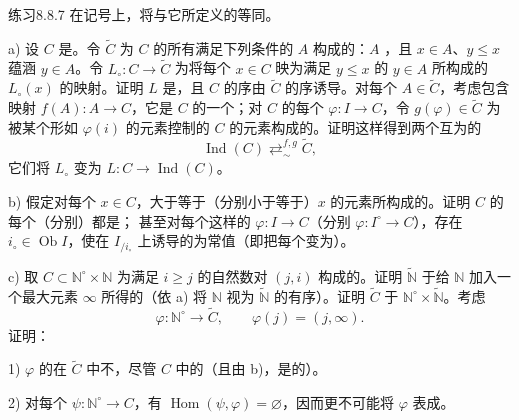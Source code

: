 \begin{SGAresult}{练习}{8.8.7}
在记号上，将与它所定义的等同。

 a) 设 $C$ 是。令 $\widetilde C$ 为 $C$ 的所有满足下列条件的 $A$ 构成的：$A$ ，且 $x\in A$、$y\leq x$ 蕴涵 $y\in A$。令 $L_\circ:C\to\widetilde C$ 为将每个 $x\in C$ 映为满足 $y\leq x$ 的 $y\in A$ 所构成的 $L_\circ(x)$ 的映射。证明 $L$ 是，且 $C$ 的序由 $\widetilde C$ 的序诱导。对每个 $A\in\widetilde C$，考虑包含映射 $f(A):A\to C$，它是 $C$ 的一个；对 $C$ 的每个  $\varphi:I\to C$，令 $g(\varphi)\in\widetilde C$ 为被某个形如 $\varphi(i)$ 的元素控制的 $C$ 的元素构成的。证明这样得到两个互为的
\[
\operatorname{Ind}(C)\mathrel{\mathop{\rightleftarrows}^{f,g}_{\sim}}\widetilde C,
\]
它们将 $L_\circ$ 变为 $L:C\to\operatorname{Ind}(C)$。

 b) 假定对每个 $x\in C$，大于等于（分别小于等于）$x$ 的元素所构成的。证明 $C$ 的每个（分别）都是；
甚至对每个这样的 $\varphi:I\to C$（分别 $\varphi:I^\circ\to C$），存在 $i_\circ\in\operatorname{Ob}I$，使在 $I_{/i_\circ}$ 上诱导的为常值（即把每个变为）。

 c) 取 $C\subset\mathbb N^\circ\times\mathbb N$ 为满足 $i\geq j$ 的自然数对 $(j,i)$ 构成的。证明 $\widetilde{\mathbb N}$ 于给 $\mathbb N$ 加入一个最大元素 $\infty$ 所得的（依 a) 将 $\mathbb N$ 视为 $\widetilde{\mathbb N}$ 的有序）。证明 $\widetilde C$ 于 $\mathbb N^\circ\times\widetilde{\mathbb N}$。考虑
\[
\varphi:\mathbb N^\circ\longrightarrow\widetilde C,\qquad
\varphi(j)=(j,\infty).
\]
证明：

 1) $\varphi$ 的在 $\widetilde C$ 中不，尽管 $C$ 中的（且由 b)，是的）。

 2) 对每个 $\psi:\mathbb N^\circ\to C$，有 $\operatorname{Hom}(\psi,\varphi)=\varnothing$，因而更不可能将 $\varphi$ 表成。
\end{SGAresult}
